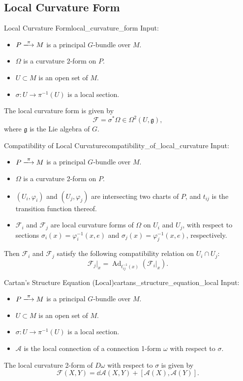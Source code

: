 \documentclass{article}
\begin{document}
\subsection{Local Curvature Form}

\begin{definition}{Local Curvature Form}{local_curvature_form}
    Input:
    \begin{itemize}
        \item $P\xlongrightarrow{\pi} M$ is a principal $G$-bundle over $M$.
        \item $\Omega$ is a curvature 2-form on $P$.
        \item $U\subset M$ is an open set of $M$.
        \item $\sigma: U \rightarrow \pi^{-1}(U)$ is a local section.
    \end{itemize}
    The local curvature form is given by
    \[ \mathcal{F} = \sigma^* \Omega \in \Omega^2(U, \mathfrak{g}), \]
    where $\mathfrak{g}$ is the Lie algebra of $G$.
\end{definition}

\begin{theorem}{Compatibility of Local Curvature}{compatibility_of_local_curvature}
    Input:
    \begin{itemize}
        \item $P\xlongrightarrow{\pi} M$ is a principal $G$-bundle over $M$.
        \item $\Omega$ is a curvature 2-form on $P$.
        \item $(U_i,\varphi_i)$ and $(U_j,\varphi_j)$ are intersecting two charts of $P$, and $t_{ij}$ is the transition function thereof.
        \item $\mathcal{F}_i$ and $\mathcal{F}_j$ are local curvature forms of $\Omega$ on $U_i$ and $U_j$, with respect to sections $\sigma_i(x) = \varphi^{-1}_i(x, e)$ and $\sigma_j(x) = \varphi^{-1}_j(x, e)$, respectively.
    \end{itemize}
    Then $\mathcal{F}_i$ and $\mathcal{F}_j$ satisfy the following compatibility relation on $U_i \cap U_j$:
    \[ \mathcal{F}_j\vert_x = \operatorname{Ad}_{t^{-1}_{ij}(x)}(\mathcal{F}_i\vert_x). \]
\end{theorem}

\begin{theorem}{Cartan's Structure Equation (Local)}{cartans_structure_equation_local}
    Input:
    \begin{itemize}
        \item $P\xlongrightarrow{\pi} M$ is a principal $G$-bundle over $M$.
        \item $U\subset M$ is an open set of $M$.
        \item $\sigma: U \rightarrow \pi^{-1}(U)$ is a local section.
        \item $\mathcal{A}$ is the local connection of a connection 1-form $\omega$ with respect to $\sigma$.
    \end{itemize}
    The local curvature 2-form of $D\omega$ with respect to $\sigma$ is given by
    \[ \mathcal{F}(X, Y) = \dd{\mathcal{A}}(X, Y) + [\mathcal{A}(X), \mathcal{A}(Y)]. \]
\end{theorem}
\end{document}
